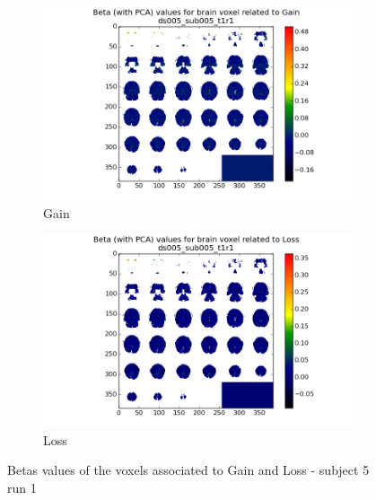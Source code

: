 \begin{figure}[H]
\begin{subfigure}{.5\textwidth}
  \centering
  \includegraphics[width=.9\linewidth]{../fig/mosaic/ds005_sub005_t1r1_withPCA_Gain.png}
  \caption{Gain}
  \label{fig:fig1}
\end{subfigure}%
\begin{subfigure}{.5\textwidth}
  \centering
  \includegraphics[width=.9\linewidth]{../fig/mosaic/ds005_sub005_t1r1_withPCA_Loss.png}
  \caption{Loss}
  \label{fig:fig2}
\end{subfigure}
\caption{Betas values of the voxels associated to Gain and Loss - subject 5 run 1}
\label{fig:figa}
\end{figure}



